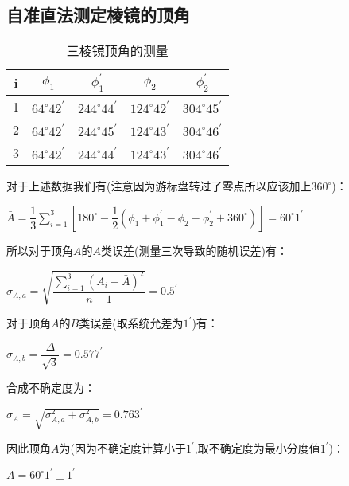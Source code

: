 \documentclass[a4 paper,12pt]{article}
\begin{document}
\subsection{自准直法测定棱镜的顶角}
\begin{table}[H]
	\centering
	\caption{三棱镜顶角的测量}
	\label{三棱镜顶角的测量}
	\begin{tabular}{c|*{4}{c}}
		\toprule[0.5mm]
		i&$\phi_{1}$&$\phi_{1}^{\prime}$&$\phi_{2}$&$\phi_{2}^{\prime}$\\
		\midrule
		1&$64^{\circ}42^{\prime}$&$244^{\circ}44^{\prime}$&$124^{\circ}42^{\prime}$&$304^{\circ}45^{\prime}$\\
		2&$64^{\circ}42^{\prime}$&$244^{\circ}45^{\prime}$&$124^{\circ}43^{\prime}$&$304^{\circ}46^{\prime}$\\
		3&$64^{\circ}42^{\prime}$&$244^{\circ}44^{\prime}$&$124^{\circ}43^{\prime}$&$304^{\circ}46^{\prime}$\\
		\bottomrule[0.5mm]
	\end{tabular}
\end{table}
对于上述数据我们有(注意因为游标盘转过了零点所以应该加上$360^{\circ}$)：
\begin{center}
	$\bar{A}=\dfrac{1}{3}\sum\limits_{i=1}^{3}[180^{\circ}-\dfrac{1}{2}(\phi_{1}+\phi_{1}^{\prime}-\phi_{2}-\phi_{2}^{\prime}+360^{\circ})]=60^{\circ}1^{\prime}$
\end{center}
\par 所以对于顶角$A$的$A$类误差(测量三次导致的随机误差)有：
\begin{center}
	$\sigma_{A,a}=\sqrt{\dfrac{\sum\limits_{i=1}^{3}(A_{i}-\bar{A})^{2}}{n-1}}=0.5^{\prime}$
\end{center}
\par 对于顶角$A$的$B$类误差(取系统允差为$1^{\prime}$)有：
\begin{center}
	$\sigma_{A,b}=\dfrac{\Delta}{\sqrt{3}}=0.577^{\prime}$
\end{center}
\par 合成不确定度为：
\begin{center}
	$\sigma_{A}=\sqrt{\sigma_{A,a}^{2}+\sigma_{A,b}^{2}}=0.763^{\prime}$
\end{center}
\par 因此顶角$A$为(因为不确定度计算小于$1^{\prime}$,取不确定度为最小分度值$1^{\prime}$)：
\begin{center}
	$A=60^{\circ}1^{\prime}\pm 1^{\prime}$
\end{center}
\end{document}
